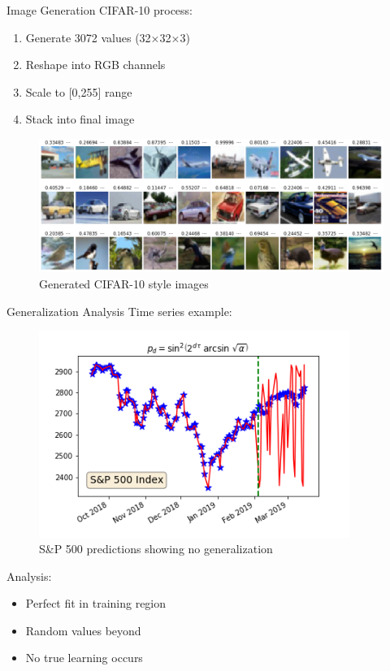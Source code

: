 \documentclass[10pt]{beamer}
\begin{document}
\begin{frame}{Image Generation}
CIFAR-10 process:
\begin{enumerate}
\item Generate 3072 values (32×32×3)
\item Reshape into RGB channels
\item Scale to [0,255] range
\item Stack into final image
\end{enumerate}

\begin{figure}
\includegraphics[width=\textwidth]{fig/note01/cifar.png}
\caption{Generated CIFAR-10 style images}
\end{figure}
\end{frame}

\begin{frame}{Generalization Analysis}
Time series example:
\begin{figure}
  \includegraphics[width=0.9\textwidth]{fig/note01/timeseries.png}
\caption{S\&P 500 predictions showing no generalization}
\end{figure}

Analysis:
\begin{itemize}
\item Perfect fit in training region
\item Random values beyond
\item No true learning occurs
\end{itemize}
\end{frame}
\end{document}
